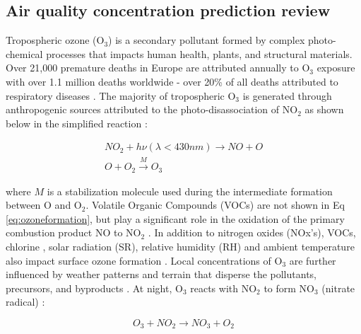 \clearpage
\subsection{Air quality concentration prediction review }

Tropospheric ozone (O$_{3}$) is a secondary pollutant formed by complex photo-chemical processes that impacts human health, plants, and structural materials. Over 21,000 premature deaths in Europe are attributed annually to O$_{3}$ exposure \citep{WHO2008} with over 1.1 million deaths worldwide - over 20\% of all deaths attributed to respiratory diseases \citep{Malley2017}. The majority of tropospheric O$_{3}$ is generated through anthropogenic sources \citep{Lelieveld2000, Cooper2006} attributed to the photo-disassociation of NO$_{2}$ as shown below in the simplified reaction \citep{Finlayson1993}:

\begin{equation}
\label{eq:ozoneformation}
\begin{gathered}
NO_{2}+h\nu (\lambda < 430nm) \rightarrow NO+O \\
O+O_{2}\overset{M}{\rightarrow} O_{3}
\end{gathered}
\end{equation}

\noindent
where $M$ is a stabilization molecule used during the intermediate formation between O and O$_{2}$. Volatile Organic Compounds (VOCs) are not shown in Eq \ref{eq:ozoneformation}, but play a significant role in the oxidation of the primary combustion product NO to NO$_{2}$ \citep{Song2011}. In addition to nitrogen oxides (NOx's), VOCs, chlorine \citep{Thornton2010}, solar radiation (SR), relative humidity (RH) and ambient temperature also impact surface ozone formation \citep{Sadanaga2003}.  Local concentrations of O$_{3}$ are further influenced by weather patterns and terrain that disperse the pollutants, precursors, and byproducts \citep{Beck1998}. At night, O$_{3}$ reacts with NO$_{2}$ to form NO$_{3}$ (nitrate radical) \citep{Finlayson1993}:

\begin{equation}
\label{eq:nitrateformation}
O_{3} + NO_{2}\rightarrow NO_{3}+O_{2} 
\end{equation}

